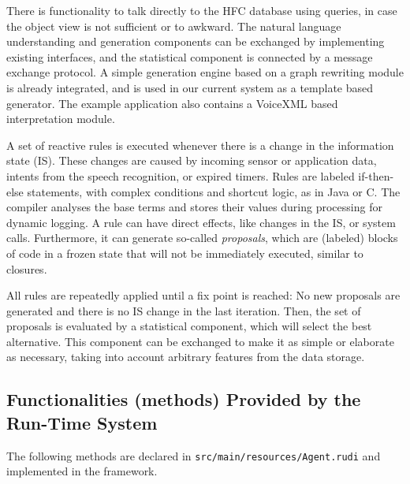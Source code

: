 There is functionality to talk directly to the HFC database using queries, in
case the object view is not sufficient or to awkward. The natural language
understanding and generation components can be exchanged by implementing existing
interfaces, and the statistical component is connected by a message exchange
protocol. A simple generation engine based on a graph rewriting module is
already integrated, and is used in our current system as a template based
generator. The example application also contains a VoiceXML based
interpretation module.

A set of reactive rules is executed whenever there is a change in the
information state (IS). These changes are caused by incoming sensor or
application data, intents from the speech recognition, or expired timers.
Rules are labeled if-then-else statements, with complex conditions and shortcut
logic, as in Java or C. The compiler analyses the base terms and stores their
values during processing for dynamic logging. A rule can have direct effects,
like changes in the IS, or system calls. Furthermore, it can generate so-called
\emph{proposals}, which are (labeled) blocks of code in a frozen state that
will not be immediately executed, similar to closures.

All rules are repeatedly applied until a fix point is reached: No new proposals
are generated and there is no IS change in the last iteration. Then, the set of
proposals is evaluated by a statistical component, which will select the best
alternative. This component can be exchanged to make it as simple or elaborate
as necessary, taking into account arbitrary features from the data storage.

\subsection{Functionalities (methods) Provided by the Run-Time System}
The following methods are declared in \texttt{src/main/resources/Agent.rudi} and implemented in the \vonda framework.

